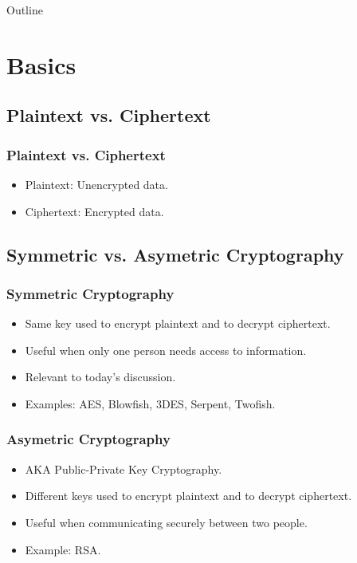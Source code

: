 \documentclass[xcolor={dvipsnames,svgnames},hyperref=dvips]{beamer}
\title[Full-Disk Encryption]{}
\author{Wade Cline}
\date{04 March 2014}
\begin{document}
\begin{frame}
  \titlepage
\end{frame}

\begin{frame}{Outline}
  \tableofcontents
\end{frame}

\section{Basics}\label{section:basics}
	\subsection{Plaintext vs. Ciphertext}
	\begin{frame}
		\frametitle{Plaintext vs. Ciphertext}
		\begin{itemize}
		\item Plaintext: Unencrypted data.
		\item Ciphertext: Encrypted data.
		\end{itemize}
	\end{frame}

	\subsection{Symmetric vs. Asymetric Cryptography}
	\begin{frame}
		\frametitle{Symmetric Cryptography}
		\begin{itemize}
		\item Same key used to encrypt plaintext and to decrypt ciphertext. 
		\item Useful when only one person needs access to information.
		\item Relevant to today's discussion.
		\item Examples: AES, Blowfish, 3DES, Serpent, Twofish.
		\end{itemize}
	\end{frame}

	\begin{frame}
		\frametitle{Asymetric Cryptography}
		\begin{itemize}
		\item AKA Public-Private Key Cryptography.
		\item Different keys used to encrypt plaintext and to decrypt ciphertext.
		\item Useful when communicating securely between two people.
		\item Example: RSA.
		\end{itemize}
	\end{frame}
\end{document}
